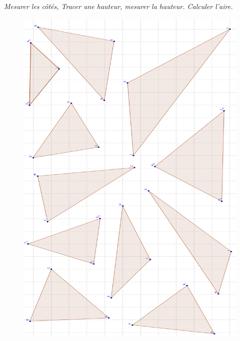 \documentclass[11pt]{article}
\begin{document}
\textit{Mesurer les côtés, Tracer une hauteur, mesurer la hauteur. Calculer l'aire.}

\begin{figure}[H]
  \centering
  \includegraphics[width=0.8\linewidth]{5x2-triangles/sources/hauteur-3.png}
\end{figure}
\end{document}

